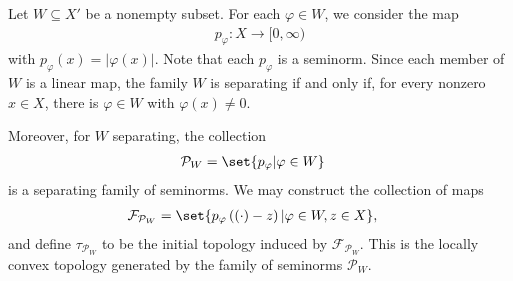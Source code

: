 \documentclass[10pt]{mypackage}
\begin{document}
Let $W\subseteq X'$ be a nonempty subset. For each $\varphi\in W$, we consider the map
\begin{align*}
  p_{\varphi}: X\rightarrow [0,\infty)
\end{align*}
with $p_{\varphi}\left(x\right) = \left\vert \varphi\left(x\right) \right\vert$. Note that each $p_{\varphi}$ is a seminorm. Since each member of $W$ is a linear map, the family $W$ is separating if and only if, for every nonzero $x\in X$, there is $\varphi\in W$ with $\varphi(x) \neq 0$.\newline

Moreover, for $W$ separating, the collection
\begin{align*}
  \mathcal{P}_{W} &= \set{p_{\varphi} | \varphi\in W}
\end{align*}
is a separating family of seminorms. We may construct the collection of maps
\begin{align*}
  \mathcal{F}_{\mathcal{P}_{W}} &= \set{p_{\varphi}\left((\cdot) - z\right) | \varphi\in W,z\in X},
\end{align*}
and define $\tau_{\mathcal{P}_{W}}$ to be the initial topology induced by $\mathcal{F}_{\mathcal{P}_{W}}$. This is the locally convex topology generated by the family of seminorms $\mathcal{P}_{W}$.\newline
\end{document}

